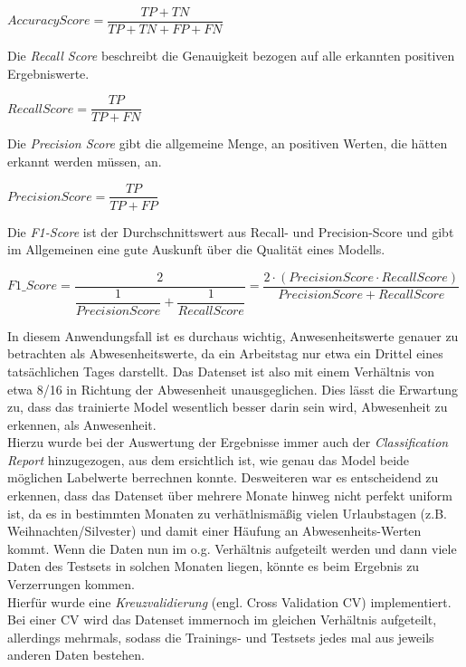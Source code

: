 \begin{center}
    $AccuracyScore = \dfrac{TP + TN}{TP + TN + FP + FN}$    
\end{center}
Die \textit{Recall Score} beschreibt die Genauigkeit bezogen auf alle erkannten positiven Ergebniswerte. 
\begin{center}
    $RecallScore = \dfrac{TP}{TP + FN}$    
\end{center}

Die \textit{Precision Score} gibt die allgemeine Menge, an positiven Werten, die hätten erkannt werden müssen,
an.
\begin{center}
    $PrecisionScore = \dfrac{TP}{TP + FP}$    
\end{center}

Die \textit{F1-Score} ist der Durchschnittswert aus Recall- und Precision-Score und gibt im Allgemeinen eine 
gute Auskunft über die Qualität eines Modells.\\

\begin{center}
    $F1\_Score = \dfrac{2}{\dfrac{1}{PrecisionScore} + \dfrac{1}{RecallScore}} = \dfrac{2 \cdot (PrecisionScore \cdot RecallScore)}{PrecisionScore + RecallScore}$    
\end{center}

\vspace{0.75cm}
In diesem Anwendungsfall ist es durchaus wichtig, Anwesenheitswerte genauer zu betrachten als 
Abwesenheitswerte, da ein Arbeitstag nur etwa ein Drittel eines tatsächlichen Tages darstellt. 
Das Datenset ist also mit einem Verhältnis von etwa 8/16 in Richtung der Abwesenheit unausgeglichen. Dies 
lässt die Erwartung zu, dass das trainierte Model wesentlich besser darin sein wird, Abwesenheit zu erkennen,
als Anwesenheit.\\
Hierzu wurde bei der Auswertung der Ergebnisse immer auch der \textit{Classification Report} hinzugezogen,
aus dem ersichtlich ist, wie genau das Model beide möglichen Labelwerte berrechnen konnte.
\newpage
Desweiteren war es entscheidend zu erkennen, dass das Datenset über mehrere Monate hinweg nicht perfekt uniform 
ist, da es in bestimmten Monaten zu verhätlnismäßig vielen Urlaubstagen (z.B. Weihnachten/Silvester) und damit 
einer Häufung an Abwesenheits-Werten kommt.
Wenn die Daten nun im o.g. Verhältnis aufgeteilt werden und dann viele Daten des Testsets in solchen Monaten 
liegen, könnte es beim Ergebnis zu Verzerrungen kommen.\\
Hierfür wurde eine \textit{Kreuzvalidierung} (engl. Cross Validation CV) implementiert. Bei einer CV wird das 
Datenset immernoch im gleichen Verhältnis aufgeteilt, allerdings mehrmals, sodass die Trainings- und Testsets 
jedes mal aus jeweils anderen Daten bestehen.

